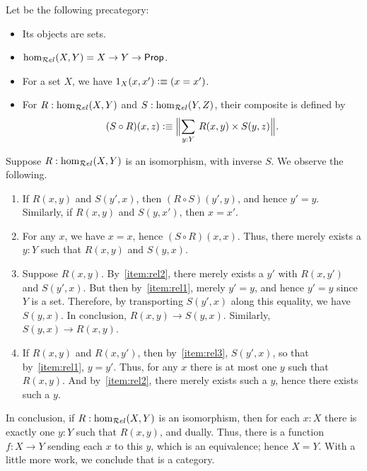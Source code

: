 \documentclass[hott-all.tex]{subfiles}
\begin{document}
\begin{eg}
  Let \urel be the following precategory:
  \begin{itemize}
  \item Its objects are sets.
  \item $\hom_{\mathcal{R}el}(X,Y) = X\to Y\to \mathsf{Prop}$.
  \item For a set $X$, we have $1_X(x,x') \vcentcolon\equiv (x=x')$.
  \item For $R:\hom_{\mathcal{R}el}(X,Y)$ and $S:\hom_{\mathcal{R}el}(Y,Z)$, their composite is defined by
    \[ (S\circ R)(x,z) \defeq \Brck{\sm{y:Y} R(x,y) \times S(y,z)}.\]
  \end{itemize}
  Suppose $R:\hom_{\mathcal{R}el}(X,Y)$ is an isomorphism, with inverse $S$.
  We observe the following.
  \begin{enumerate}
  \item If $R(x,y)$ and $S(y',x)$, then $(R\circ S)(y',y)$, and hence $y'=y$.
    Similarly, if $R(x,y)$ and $S(y,x')$, then $x=x'$.
  \item For any $x$, we have $x=x$, hence $(S\circ R)(x,x)$.
    Thus, there merely exists a $y:Y$ such that $R(x,y)$ and $S(y,x)$.
  \item Suppose $R(x,y)$.
    By~\ref{item:rel2}, there merely exists a $y'$ with $R(x,y')$ and $S(y',x)$.
    But then by~\ref{item:rel1}, merely $y'=y$, and hence $y'=y$ since $Y$ is a set.
    Therefore, by transporting $S(y',x)$ along this equality, we have $S(y,x)$.
    In conclusion, $R(x,y)\to S(y,x)$.
    Similarly, $S(y,x) \to R(x,y)$.
  \item If $R(x,y)$ and $R(x,y')$, then by~\ref{item:rel3}, $S(y',x)$, so that by~\ref{item:rel1}, $y=y'$.
    Thus, for any $x$ there is at most one $y$ such that $R(x,y)$.
    And by~\ref{item:rel2}, there merely exists such a $y$, hence there exists such a $y$.
  \end{enumerate}
  In conclusion, if $R:\hom_{\mathcal{R}el}(X,Y)$ is an isomorphism, then for each $x:X$ there is exactly one $y:Y$ such that $R(x,y)$, and dually.
  Thus, there is a function $f:X\to Y$ sending each $x$ to this $y$, which is an equivalence; hence $X=Y$.
  With a little more work, we conclude that \urel is a category.
\end{eg}

%
\end{document}
